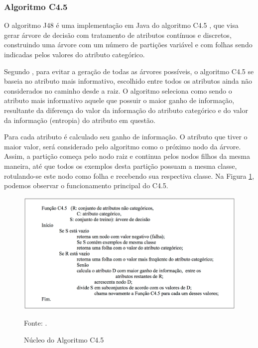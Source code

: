 \documentclass[
	12pt,				%
	openright,			%
	oneside,	
	a4paper,				%
	english,				%
	brazil				%
]{abntex2/abntex2} %
\begin{document}
	\subsubsection{Algoritmo C4.5}
	
	O algoritmo J48 \cite{weka:2015} é uma implementação em Java \cite{oracle:2015} do algoritmo C4.5 \cite{quinlan:94}, que visa gerar árvore de decisão com tratamento de atributos contínuos e discretos, construindo uma árvore com um número de partições variável e com folhas sendo indicadas pelos valores do atributo categórico. 
	
	Segundo \cite{halmenschlager:2002}, para evitar a geração de todas as árvores possíveis, o algoritmo C4.5 se baseia no atributo mais informativo, escolhido entre todos os atributos ainda não considerados no caminho desde a raiz. O algoritmo seleciona como sendo o atributo mais informativo aquele que possuir o maior ganho de informação, resultante da diferença do valor da informação do atributo categórico e do valor da informação (entropia) do atributo em questão.
	
	Para cada atributo é calculado seu ganho de informação. O atributo que tiver o maior valor, será considerado pelo algoritmo como o próximo nodo da árvore. Assim, a partição começa pelo nodo raiz e continua pelos nodos filhos da mesma maneira, até que todos os exemplos desta partição possuam a mesma classe, rotulando-se este nodo como folha e recebendo sua respectiva classe. Na Figura \ref{fignucleoC45}, podemos observar o funcionamento principal do C4.5.
	
		\begin{figure}[!htb]
			\caption{\label{fignucleoC45} Núcleo do Algoritmo C4.5}
			\begin{center}
				\includegraphics[scale=0.4]{img/nucleoC45.png}
			\end{center}
			Fonte: \cite{feldens:1997}.
		\end{figure}
	
\end{document}
